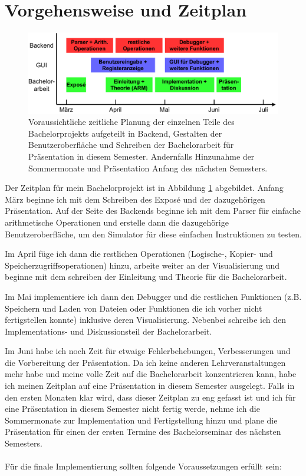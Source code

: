\documentclass[a4paper, 11pt, onecolumn]{article}
\begin{document}
\section{Vorgehensweise und Zeitplan}

\begin{figure}[!htb]	
	\includegraphics[width=0.8\paperwidth]{data/timeline}
	\caption{Voraussichtliche zeitliche Planung der einzelnen Teile des Bachelorprojekts aufgeteilt in Backend, Gestalten der Benutzeroberfläche und Schreiben der Bachelorarbeit für Präsentation in diesem Semester. Andernfalls Hinzunahme der Sommermonate und Präsentation Anfang des nächsten Semesters.}
	\label{timeline}
\end{figure}

Der Zeitplan für mein Bachelorprojekt ist in Abbildung \ref{timeline} abgebildet. Anfang März beginne ich mit dem Schreiben des Exposé und der dazugehörigen Präsentation. Auf der Seite des Backends beginne ich mit dem Parser für einfache arithmetische Operationen und erstelle dann die dazugehörige Benutzeroberfläche, um den Simulator für diese einfachen Instruktionen zu testen.

Im April füge ich dann die restlichen Operationen (Logische-, Kopier- und Speicherzugriffsoperationen) hinzu, arbeite weiter an der Visualisierung und beginne mit dem schreiben der Einleitung und Theorie für die Bachelorarbeit.

Im Mai implementiere ich dann den Debugger und die restlichen Funktionen (z.B. Speichern und Laden von Dateien oder Funktionen die ich vorher nicht fertigstellen konnte) inklusive deren Visualisierung. Nebenbei schreibe ich den Implementations- und Diskussionsteil der Bachelorarbeit.

Im Juni habe ich noch Zeit für etwaige Fehlerbehebungen, Verbesserungen und die Vorbereitung der Präsentation. Da ich keine anderen Lehrveranstaltungen mehr habe und meine volle Zeit auf die Bachelorarbeit konzentrieren kann, habe ich meinen Zeitplan auf eine Präsentation in diesem Semester ausgelegt. Falls in den ersten Monaten klar wird, dass dieser Zeitplan zu eng gefasst ist und ich für eine Präsentation in diesem Semester nicht fertig werde, nehme ich die Sommermonate zur Implementation und Fertigstellung hinzu und plane die Präsentation für einen der ersten Termine des Bachelorseminar des nächsten Semesters.\\ \\
Für die finale Implementierung sollten folgende Voraussetzungen erfüllt sein:
\end{document}
